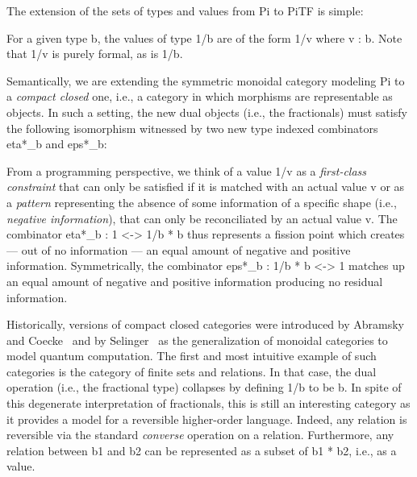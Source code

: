 \documentclass{llncs}
\newcommand{\dgm}[2][1.5]{
\begin{center}
\scalebox{#1}{
\texttt{[image: diagrams/\#2.pdf]}
}
\end{center}
}
\begin{document}
The extension of the sets of types and values from {{Pi}} to {{PiTF}} is
simple:

\noindent For a given type {{b}}, the values of type {{1/b}} are of the form
{{1/v}} where {{v : b}}. Note that {{1/v}} is purely formal, as is
{{1/b}}. 

Semantically, we are extending the symmetric monoidal category modeling
{{Pi}} to a \emph{compact closed} one, i.e., a category in which morphisms
are representable as objects. In such a setting, the new dual objects (i.e.,
the fractionals) must satisfy the following isomorphism witnessed by two new
type indexed combinators {{eta*_b}} and {{eps*_b}}:
\begin{multicols}{3}
  \dgm{eta_times2}

\columnbreak


\columnbreak

  \dgm{eps_times2}  
\end{multicols}


\vspace{-10pt}
\noindent From a programming perspective, we think of a value {{1/v}} as a
\emph{first-class constraint} that can only be satisfied if it is matched
with an actual value {{v}} or as a \emph{pattern} representing the absence of
some information of a specific shape (i.e., \emph{negative information}),
that can only be reconciliated by an actual value {{v}}. The combinator
{{eta*_b : 1 <-> 1/b * b}} thus represents a fission point which creates ---
out of no information --- an equal amount of negative and positive
information. Symmetrically, the combinator {{eps*_b : 1/b * b <-> 1}} matches
up an equal amount of negative and positive information producing no residual
information. 

Historically, versions of compact closed categories were introduced by
Abramsky and Coecke~\cite{Abramsky:2004:CSQ:1018438.1021878} and by
Selinger~\cite{Selinger:2007:DCC:1229185.1229207} as the generalization of
monoidal categories to model quantum computation.  The first and most
intuitive example of such categories is the category of finite sets and
relations. In that case, the dual operation (i.e., the fractional type)
collapses by defining {{1/b}} to be {{b}}. In spite of this degenerate
interpretation of fractionals, this is still an interesting category as it
provides a model for a reversible higher-order language. Indeed, any relation
is reversible via the standard \emph{converse} operation on a relation.
Furthermore, any relation between {{b1}} and {{b2}} can be represented as
a subset of {{b1 * b2}}, i.e., as a value. 
\end{document}

